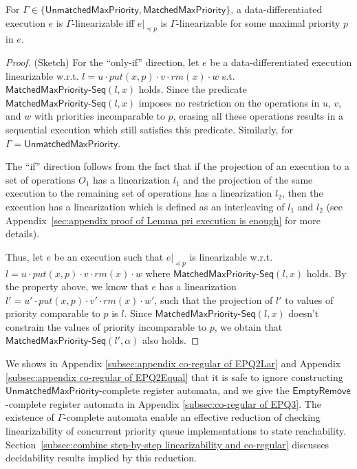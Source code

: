 \begin{lemma}
\label{lemma:pri execution is enough}
For $\Gamma\in \{\mathsf{UnmatchedMaxPriority}, \mathsf{MatchedMaxPriority}\}$, a data-differentiated execution $e$
 is $\Gamma$-linearizable iff $e\vert_{\preceq p}$ is $\Gamma$-linearizable for some maximal priority $p$ in $e$.
\end{lemma}
\begin {proof} (Sketch)
For the ``only-if'' direction, let $e$ be a data-differentiated execution linearizable w.r.t. $l = u \cdot \textit{put}(x,p) \cdot v \cdot \textit{rm}(x) \cdot w$ s.t. $\mathsf{MatchedMaxPriority}\mathsf{\text{-}Seq}(l,x)$ holds. Since the predicate $\mathsf{MatchedMaxPriority}\mathsf{\text{-}Seq}(l,x)$ imposes no restriction on the operations in $u$, $v$, and $w$ with priorities incomparable to $p$, erasing all these operations results in a sequential execution which still satisfies this predicate. Similarly, for $\Gamma=\mathsf{UnmatchedMaxPriority}$.

The ``if'' direction follows from the fact that if the projection of an execution to a set of operations $O_1$ has a linearization $l_1$ and the projection of the same execution to the remaining set of operations has a linearization $l_2$, then the execution has a linearization which is defined as an interleaving of $l_1$ and $l_2$ (see Appendix~\ref{sec:appendix proof of Lemma pri execution is enough} for more details).

Thus, let $e$ be an execution such that $e\vert_{\preceq p}$ is linearizable w.r.t. $l = u \cdot \textit{put}(x,p) \cdot v \cdot \textit{rm}(x) \cdot w$ where $\mathsf{MatchedMaxPriority}\mathsf{\text{-}Seq}(l,x)$ holds. By the property above, we know that $e$ has a linearization $l' = u' \cdot \textit{put}(x,p) \cdot v' \cdot \textit{rm}(x) \cdot w'$, such that the projection of $l'$ to values of priority comparable to $p$ is $l$.
Since $\mathsf{MatchedMaxPriority}\mathsf{\text{-}Seq}(l,x)$ doesn't constrain the values of priority incomparable to $p$, we obtain that $\mathsf{MatchedMaxPriority}\mathsf{\text{-}Seq}(l',\alpha)$ also holds.
\end {proof}

We shows in Appendix \ref{subsec:appendix co-regular of EPQ2Lar} and Appendix \ref{subsec:appendix co-regular of EPQ2Equal} that it is safe to ignore constructing $\mathsf{UnmatchedMaxPriority}$-complete register automata, and we give the $\mathsf{EmptyRemove}$-complete register automata in Appendix \ref{subsec:co-regular of EPQ3}. The existence of $\Gamma$-complete automata enable an effective reduction of checking linearizability of concurrent priority queue implementations to state reachability.
Section~\ref{subsec:combine step-by-step linearizability and co-regular} discusses decidability results implied by this reduction.

